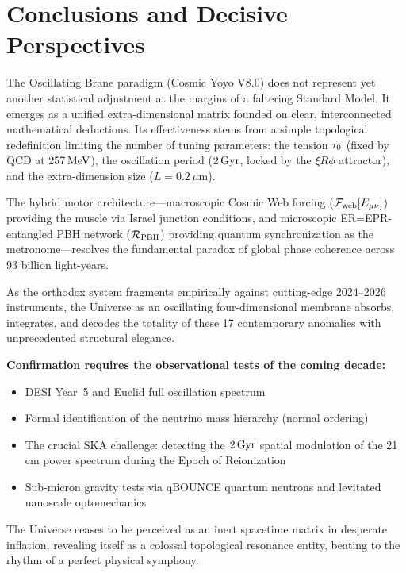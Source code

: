 \section{Conclusions and Decisive Perspectives}
\label{sec:discovery_conclusions}

The Oscillating Brane paradigm (Cosmic Yoyo V8.0) does not represent yet another statistical adjustment at the margins of a faltering Standard Model. It emerges as a unified extra-dimensional matrix founded on clear, interconnected mathematical deductions. Its effectiveness stems from a simple topological redefinition limiting the number of tuning parameters: the tension $\tau_0$ (fixed by QCD at $257\,\text{MeV}$), the oscillation period ($2\,\text{Gyr}$, locked by the $\xi R\phi$ attractor), and the extra-dimension size ($L = 0.2\,\mu$m).

The hybrid motor architecture---macroscopic Cosmic Web forcing ($\mathcal{F}_\text{web}[E_{\mu\nu}]$) providing the muscle via Israel junction conditions, and microscopic ER=EPR-entangled PBH network ($\mathcal{R}_\text{PBH}$) providing quantum synchronization as the metronome---resolves the fundamental paradox of global phase coherence across 93 billion light-years.

As the orthodox \LCDM{} system fragments empirically against cutting-edge 2024--2026 instruments, the Universe as an oscillating four-dimensional membrane absorbs, integrates, and decodes the totality of these 17 contemporary anomalies with unprecedented structural elegance.

\textbf{Confirmation requires the observational tests of the coming decade:}
\begin{itemize}
  \item DESI Year~5 and Euclid full oscillation spectrum
  \item Formal identification of the neutrino mass hierarchy (normal ordering)
  \item The crucial SKA challenge: detecting the $2\,\text{Gyr}$ spatial modulation of the 21\,cm power spectrum during the Epoch of Reionization
  \item Sub-micron gravity tests via qBOUNCE quantum neutrons and levitated nanoscale optomechanics
\end{itemize}

The Universe ceases to be perceived as an inert spacetime matrix in desperate inflation, revealing itself as a colossal topological resonance entity, beating to the rhythm of a perfect physical symphony.
